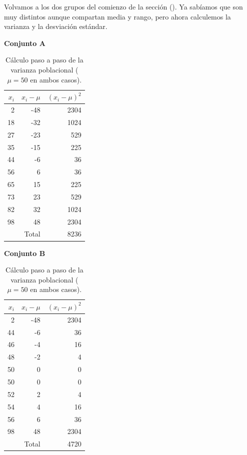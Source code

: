 \informal

Volvamos a los dos grupos del comienzo de la sección (). Ya sabíamos que son muy distintos aunque compartan media y rango, pero ahora calculemos la varianza y la desviación estándar.


\begin{table}[ht]
\centering
\caption{Cálculo paso a paso de la varianza poblacional (\(\mu=50\) en ambos casos).}
\begin{minipage}{0.45\linewidth}
\centering
\textbf{Conjunto A}

\begin{tabular}{rrr}
\toprule
\(x_i\) & \(x_i - \mu\) & \((x_i - \mu)^2\) \\
\midrule
 2 & -48 & 2304 \\
18 & -32 & 1024 \\
27 & -23 &  529 \\
35 & -15 &  225 \\
44 &  -6 &   36 \\
56 &   6 &   36 \\
65 &  15 &  225 \\
73 &  23 &  529 \\
82 &  32 & 1024 \\
98 &  48 & 2304 \\
\midrule
   &   Total & 8236 \\
\bottomrule
\end{tabular}
\end{minipage}\hfill
\begin{minipage}{0.45\linewidth}
\centering
\textbf{Conjunto B}

\begin{tabular}{rrr}
\toprule
\(x_i\) & \(x_i - \mu\) & \((x_i - \mu)^2\) \\
\midrule
 2 & -48 & 2304 \\
44 &  -6 &   36 \\
46 &  -4 &   16 \\
48 &  -2 &    4 \\
50 &   0 &    0 \\
50 &   0 &    0 \\
52 &   2 &    4 \\
54 &   4 &   16 \\
56 &   6 &   36 \\
98 &  48 & 2304 \\
\midrule
   &   Total & 4720 \\
\bottomrule
\end{tabular}
\end{minipage}
\end{table}

